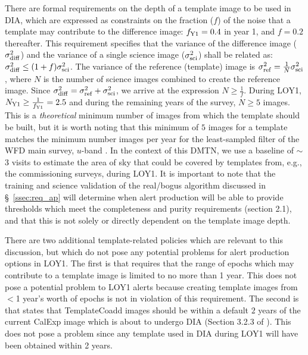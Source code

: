 \documentclass[DM,toc]{lsstdoc}
\begin{document}
There are formal requirements on the depth of a template image to be used in DIA, which are expressed as constraints on the fraction ($f$) of the noise that a template may contribute to the difference image: $f_{\rm Y1}=0.4$ in year 1, and $f=0.2$ thereafter.
This requirement specifies that the variance of the difference image ($\sigma_{\rm diff}^2$) and the variance of a single science image ($\sigma_{\rm sci}^2$) shall be related as: $\sigma_{\rm diff}^2 \leq (1+f)\sigma_{\rm sci}^2$.
The variance of the reference (template) image is $\sigma_{\rm ref}^2 = \frac{1}{N} \sigma_{\rm sci}^2$, where $N$ is the number of science images combined to create the reference image.
Since $\sigma_{\rm diff}^2 = \sigma_{\rm ref}^2 + \sigma_{\rm sci}^2$, we arrive at the expression $N \geq \frac{1}{f}$.
During LOY1, $N_{\rm Y1} \geq \frac{1}{f_{\rm Y1}} = 2.5$ and during the remaining years of the survey, $N \geq 5$ images.
This is a {\em theoretical} minimum number of images from which the template should be built, but it is worth noting that this minimum of $5$ images for a template matches the minimum number images per year for the least-sampled filter of the WFD main survey, $u$-band \citep{2019ApJ...873..111I}.
In the context of this DMTN, we use a baseline of $\sim$3 visits to estimate the area of sky that could be covered by templates from, e.g., the commissioning surveys, during LOY1.
It is important to note that the training and science validation of the real/bogus algorithm discussed in \S~\ref{ssec:req_ap} will determine when alert production will be able to provide thresholds which meet the completeness and purity requirements (section 2.1), and that this is not solely or directly dependent on the template image depth.

There are two additional template-related policies which are relevant to this discussion, but which do not pose any potential problems for alert production options in LOY1.
The first is that  requires that the range of epochs which may contribute to a template image is limited to no more than 1 year.
This does not pose a potential problem to LOY1 alerts because creating template images from $<$1 year's worth of epochs is not in violation of this requirement.
The second is that  states that TemplateCoadd images should be within a default $2$ years of the current CalExp image which is about to undergo DIA (Section 3.2.3 of \cite{LDM-151}).
This does not pose a problem since any template used in DIA during LOY1 will have been obtained within 2 years.
\end{document}
